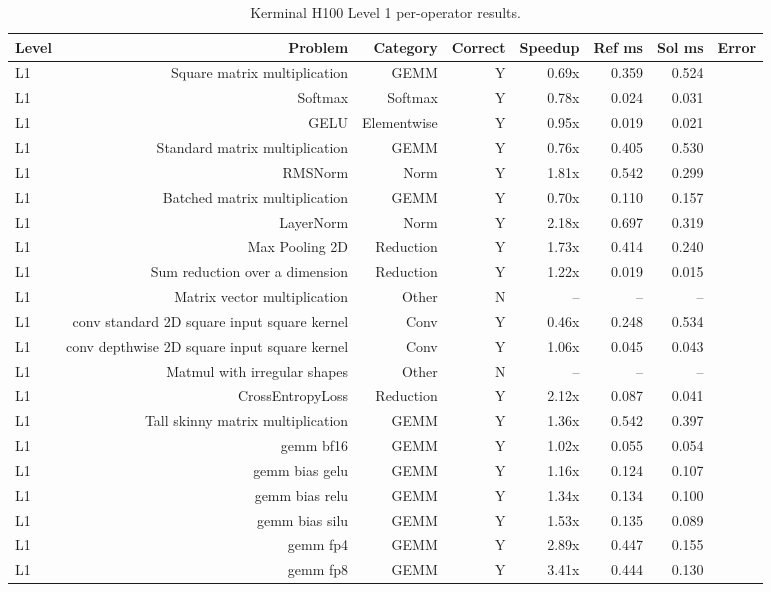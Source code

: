 \begin{table}[t]
\centering
\small
\caption{Kerminal H100 Level 1 per-operator results.}
\label{tab:kerminal-l1}
\begin{tabular}{lrrrrrrr}
\toprule
Level & Problem & Category & Correct & Speedup & Ref ms & Sol ms & Error \\
\midrule
L1 & Square matrix multiplication & GEMM & Y & 0.69x & 0.359 & 0.524 &  \\
L1 & Softmax & Softmax & Y & 0.78x & 0.024 & 0.031 &  \\
L1 & GELU & Elementwise & Y & 0.95x & 0.019 & 0.021 &  \\
L1 & Standard matrix multiplication & GEMM & Y & 0.76x & 0.405 & 0.530 &  \\
L1 & RMSNorm & Norm & Y & 1.81x & 0.542 & 0.299 &  \\
L1 & Batched matrix multiplication & GEMM & Y & 0.70x & 0.110 & 0.157 &  \\
L1 & LayerNorm & Norm & Y & 2.18x & 0.697 & 0.319 &  \\
L1 & Max Pooling 2D & Reduction & Y & 1.73x & 0.414 & 0.240 &  \\
L1 & Sum reduction over a dimension & Reduction & Y & 1.22x & 0.019 & 0.015 &  \\
L1 & Matrix vector multiplication & Other & N & -- & -- & -- &  \\
L1 & conv standard 2D  square input  square kernel & Conv & Y & 0.46x & 0.248 & 0.534 &  \\
L1 & conv depthwise 2D square input square kernel & Conv & Y & 1.06x & 0.045 & 0.043 &  \\
L1 & Matmul with irregular shapes & Other & N & -- & -- & -- &  \\
L1 & CrossEntropyLoss & Reduction & Y & 2.12x & 0.087 & 0.041 &  \\
L1 & Tall skinny matrix multiplication & GEMM & Y & 1.36x & 0.542 & 0.397 &  \\
L1 & gemm bf16 & GEMM & Y & 1.02x & 0.055 & 0.054 &  \\
L1 & gemm bias gelu & GEMM & Y & 1.16x & 0.124 & 0.107 &  \\
L1 & gemm bias relu & GEMM & Y & 1.34x & 0.134 & 0.100 &  \\
L1 & gemm bias silu & GEMM & Y & 1.53x & 0.135 & 0.089 &  \\
L1 & gemm fp4 & GEMM & Y & 2.89x & 0.447 & 0.155 &  \\
L1 & gemm fp8 & GEMM & Y & 3.41x & 0.444 & 0.130 &  \\

\end{tabular}
\end{table}

